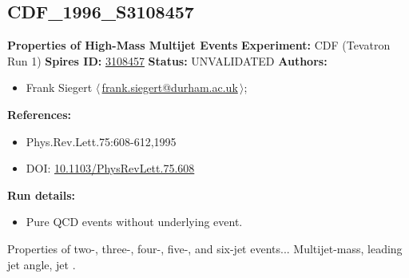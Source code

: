 \subsection[CDF\_1996\_S3108457]{CDF\_1996\_S3108457\,\cite{Abe:1995rw}}
\textbf{Properties of High-Mass Multijet Events}\newline
\textbf{Experiment:} CDF (Tevatron Run 1) \newline
\textbf{Spires ID:} \href{http://www.slac.stanford.edu/spires/find/hep/www?rawcmd=key+3108457}{3108457}\newline
\textbf{Status:} UNVALIDATED\newline
\textbf{Authors:}
\begin{itemize}
  \item Frank Siegert $\langle\,$\href{mailto:frank.siegert@durham.ac.uk}{frank.siegert@durham.ac.uk}$\,\rangle$;
\end{itemize}
\textbf{References:}
\begin{itemize}
  \item Phys.Rev.Lett.75:608-612,1995
  \item DOI: \href{http://dx.doi.org/10.1103/PhysRevLett.75.608}{10.1103/PhysRevLett.75.608}
\end{itemize}
\textbf{Run details:}
\begin{itemize}

  \item Pure QCD events without underlying event.\end{itemize}

\noindent Properties of two-, three-, four-, five-, and six-jet events... Multijet-mass, leading jet angle, jet \pT.

\clearpage


\clearpage


